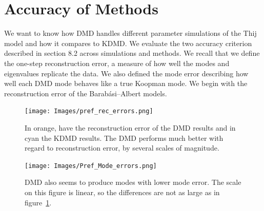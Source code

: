 \section{Accuracy of Methods}

We want to know how DMD handles different parameter simulations of the Thij model and how it compares to KDMD.
 We evaluate the two accuracy criterion described in section 8.2 across
simulations and methods. We recall that we define the one-step reconstruction error, a measure of 
how well the modes and eigenvalues replicate the data. We also defined the mode error describing how 
well each DMD mode behaves like a true Koopman mode. We begin with the
reconstruction error of the Barabási–Albert models.

\begin{figure}
    \texttt{[image: Images/pref\_rec\_errors.png]}
    \centering
    \caption{In orange, have the reconstruction error of the DMD results and in cyan 
    the KDMD results. The DMD performs much better with regard to reconstruction error, by several scales of magnitude.}
    \label{fig:prefrecerror}
\end{figure} 

\begin{figure}
    \texttt{[image: Images/Pref\_Mode\_errors.png]}
    \centering
    \caption{DMD also seems to produce modes with lower mode error. The scale on this figure is linear,
    so the differences are not as large as in figure~\ref{fig:prefrecerror}. }
\end{figure} 



